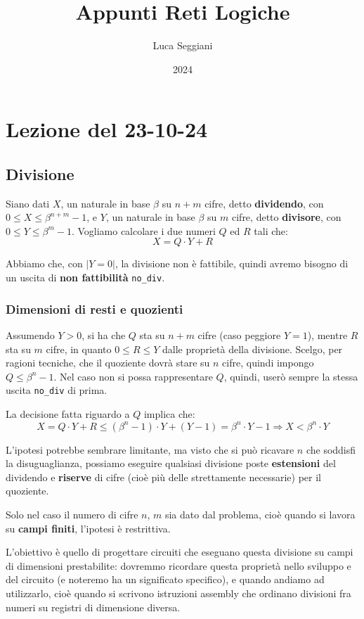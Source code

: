 \documentclass[a4paper,11pt]{article}
\title{Appunti Reti Logiche}
\author{Luca Seggiani}
\date{2024}
\begin{document}
\section{Lezione del 23-10-24}

\thispagestyle{empty}
\pagestyle{fancy}

\subsection{Divisione}
Siano dati $X$, un naturale in base $\beta$ su $n+m$ cifre, detto \textbf{dividendo}, con $0 \leq X \leq \beta^{n+m}-1$,
e $Y$, un naturale in base $\beta$ su $m$ cifre, detto \textbf{divisore}, con $0 \leq Y \leq \beta^m -1$.
Vogliamo calcolare i due numeri $Q$ ed $R$ tali che:
$$ X = Q \cdot Y + R$$

Abbiamo che, con $|Y=0|$, la divisione non è fattibile, quindi avremo bisogno di un uscita di \textbf{non fattibilità} \lstinline|no_div|.

\subsubsection{Dimensioni di resti e quozienti}
Assumendo $Y > 0$, si ha che $Q$ sta su $n+m$ cifre (caso peggiore $Y = 1$), mentre $R$ sta su $m$ cifre, in quanto $0 \leq R \leq Y$ dalle proprietà della divisione.
Scelgo, per ragioni tecniche, che il quoziente dovrà stare su $n$ cifre, quindi impongo $Q \leq \beta^n -1$.
Nel caso non si possa rappresentare $Q$, quindi, userò sempre la stessa uscita \lstinline|no_div| di prima.

La decisione fatta riguardo a $Q$ implica che:
$$ 
X = Q \cdot Y + R \leq (\beta^n - 1) \cdot Y + (Y - 1) = \beta^n \cdot Y - 1 \Rightarrow X < \beta^n \cdot Y
$$

L'ipotesi potrebbe sembrare limitante, ma visto che si può ricavare $n$ che soddisfi la disuguaglianza, possiamo eseguire qualsiasi divisione poste \textbf{estensioni} del dividendo e \textbf{riserve} di cifre (cioè più delle strettamente necessarie) per il quoziente.

Solo nel caso il numero di cifre $n$, $m$ sia dato dal problema, cioè quando si lavora su \textbf{campi finiti}, l'ipotesi è restrittiva.

L'obiettivo è quello di progettare circuiti che eseguano questa divisione su campi di dimensioni prestabilite: dovremmo ricordare questa proprietà nello sviluppo e del circuito (e noteremo ha un significato specifico), e quando andiamo ad utilizzarlo, cioè quando si scrivono istruzioni assembly che ordinano divisioni fra numeri su registri di dimensione diversa.
\end{document}
